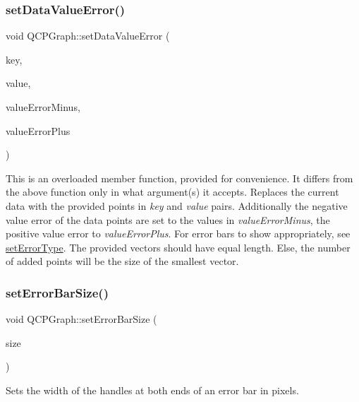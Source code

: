 \subsubsection{\texorpdfstring{set\+Data\+Value\+Error()}{setDataValueError()}\hspace{0.1cm}{\footnotesize\ttfamily [2/2]}}
{\footnotesize\ttfamily void Q\+C\+P\+Graph\+::set\+Data\+Value\+Error (\begin{DoxyParamCaption}\item[{const Q\+Vector$<$ double $>$ \&}]{key,  }\item[{const Q\+Vector$<$ double $>$ \&}]{value,  }\item[{const Q\+Vector$<$ double $>$ \&}]{value\+Error\+Minus,  }\item[{const Q\+Vector$<$ double $>$ \&}]{value\+Error\+Plus }\end{DoxyParamCaption})}

This is an overloaded member function, provided for convenience. It differs from the above function only in what argument(s) it accepts. Replaces the current data with the provided points in {\itshape key} and {\itshape value} pairs. Additionally the negative value error of the data points are set to the values in {\itshape value\+Error\+Minus}, the positive value error to {\itshape value\+Error\+Plus}. For error bars to show appropriately, see \hyperlink{class_q_c_p_graph_ac3614d799c3894f2bc646e99c7f73d38}{set\+Error\+Type}. The provided vectors should have equal length. Else, the number of added points will be the size of the smallest vector. \hypertarget{class_q_c_p_graph_a10f50c5495ce45ef559ec2066194a335}{}\label{class_q_c_p_graph_a10f50c5495ce45ef559ec2066194a335} 
\subsubsection{\texorpdfstring{set\+Error\+Bar\+Size()}{setErrorBarSize()}}
{\footnotesize\ttfamily void Q\+C\+P\+Graph\+::set\+Error\+Bar\+Size (\begin{DoxyParamCaption}\item[{double}]{size }\end{DoxyParamCaption})}

Sets the width of the handles at both ends of an error bar in pixels. \hypertarget{class_q_c_p_graph_ab1c1ee03d8dd94676a564e5e5f11aac2}{}\label{class_q_c_p_graph_ab1c1ee03d8dd94676a564e5e5f11aac2} 
